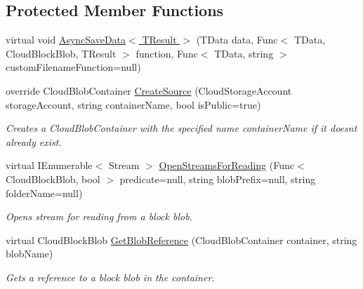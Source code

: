 \subsection*{Protected Member Functions}
\begin{DoxyCompactItemize}
\item 
virtual void \hyperlink{classCqrs_1_1Azure_1_1BlobStorage_1_1BlobStorageStore_a70157155d5b9ea9d1ac752014d6d0df6}{Async\+Save\+Data$<$ T\+Result $>$} (T\+Data data, Func$<$ T\+Data, Cloud\+Block\+Blob, T\+Result $>$ function, Func$<$ T\+Data, string $>$ custom\+Filename\+Function=null)
\item 
override Cloud\+Blob\+Container \hyperlink{classCqrs_1_1Azure_1_1BlobStorage_1_1BlobStorageStore_a68828f9e6c1f0d297623e5f0c9af0e7e}{Create\+Source} (Cloud\+Storage\+Account storage\+Account, string container\+Name, bool is\+Public=true)
\begin{DoxyCompactList}\small\item\em Creates a Cloud\+Blob\+Container with the specified name {\itshape container\+Name}  if it doesn\textquotesingle{}t already exist. \end{DoxyCompactList}\item 
virtual I\+Enumerable$<$ Stream $>$ \hyperlink{classCqrs_1_1Azure_1_1BlobStorage_1_1BlobStorageStore_a6a916e23890ba65048e449353bbd17c2}{Open\+Streams\+For\+Reading} (Func$<$ Cloud\+Block\+Blob, bool $>$ predicate=null, string blob\+Prefix=null, string folder\+Name=null)
\begin{DoxyCompactList}\small\item\em Opens stream for reading from a block blob. \end{DoxyCompactList}\item 
virtual Cloud\+Block\+Blob \hyperlink{classCqrs_1_1Azure_1_1BlobStorage_1_1BlobStorageStore_a2d38c9a30365ae357f3cf5e300c6ca25}{Get\+Blob\+Reference} (Cloud\+Blob\+Container container, string blob\+Name)
\begin{DoxyCompactList}\small\item\em Gets a reference to a block blob in the container. \end{DoxyCompactList}\end{DoxyCompactItemize}
